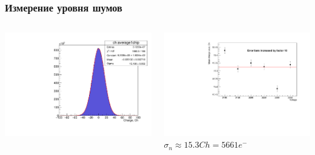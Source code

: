 \documentclass[14pt]{beamer}
\begin{document}
\begin{frame}[c]
\frametitle{Измерение уровня шумов}
\vspace{10pt}
\begin{columns}
	\begin{minipage}[t][1\textheight]{\linewidth}
		\vspace*{38pt}
		\includegraphics[width=1\linewidth]{Noise_stat.pdf}
	\end{minipage}%
	\begin{minipage}[t][1\textheight]{\linewidth}
	\vspace*{30pt}
	\includegraphics[width=1\linewidth]{Noise2voltage.pdf}
	\\ \centering \small{$\sigma_{n} \approx 15.3 Ch = 5661 e^{-}$}
	\end{minipage}
\end{columns}
\end{frame}
\end{document}
